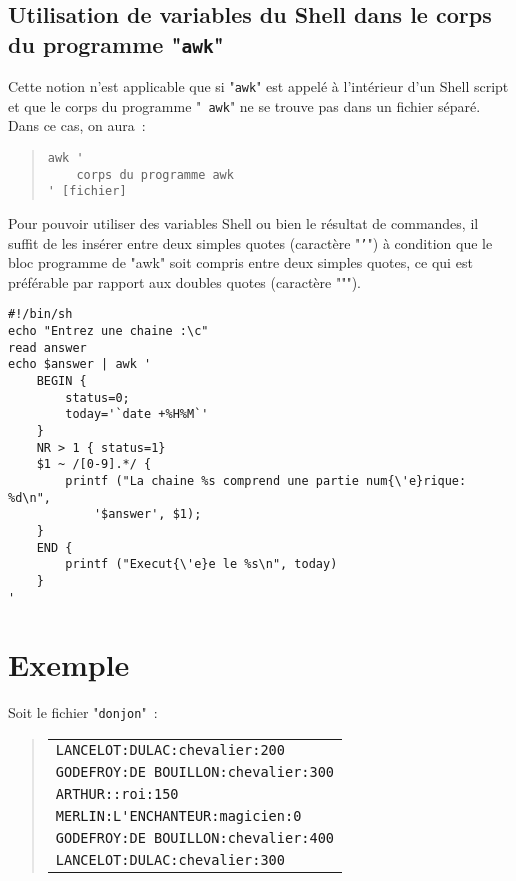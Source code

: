 \subsection{Utilisation de variables du Shell dans le corps du programme
				"\texttt{awk}"}

Cette notion n'est applicable que si "\texttt{awk}" est appel{\'e} {\`a}
l'int{\'e}rieur d'un Shell script et que le corps du programme "{\tt
awk}" ne se trouve pas dans un fichier s{\'e}par{\'e}. Dans ce cas, on aura~:
\begin{quote}
\begin{verbatim}
awk '
    corps du programme awk
' [fichier]
\end{verbatim}
\end{quote}

Pour pouvoir utiliser des variables Shell ou bien le r{\'e}sultat de
commandes, il suffit de les ins{\'e}rer entre deux simples quotes (caract{\`e}re
"\texttt{'}") {\`a} condition que le bloc programme de "awk" soit compris
entre deux simples quotes, ce qui est pr{\'e}f{\'e}rable par rapport aux doubles
quotes (caract{\`e}re """).

\begin{example}
\begin{verbatim}
#!/bin/sh
echo "Entrez une chaine :\c"
read answer
echo $answer | awk '
    BEGIN {
        status=0;
        today='`date +%H%M`'
    }
    NR > 1 { status=1}
    $1 ~ /[0-9].*/ {
        printf ("La chaine %s comprend une partie num{\'e}rique: %d\n",
            '$answer', $1);
    }
    END {
        printf ("Execut{\'e}e le %s\n", today)
    }
'
\end{verbatim}
\end{example}



\section{\label{adv-fltrs-awk-ex}Exemple}

Soit le fichier "\texttt{donjon}"~:
\begin{quote}
\begin{tabular}{|l|}
	\hline
	\verb=LANCELOT:DULAC:chevalier:200=	\\
	\verb=GODEFROY:DE BOUILLON:chevalier:300=	\\
	\verb=ARTHUR::roi:150=	\\
	\verb=MERLIN:L'ENCHANTEUR:magicien:0=	\\
	\verb=GODEFROY:DE BOUILLON:chevalier:400=	\\
	\verb=LANCELOT:DULAC:chevalier:300=	\\
	\hline
\end{tabular}
\end{quote}


